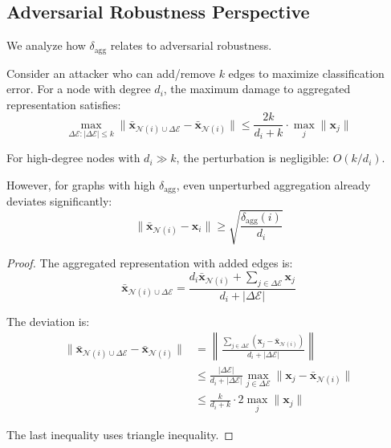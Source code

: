 \subsection{Adversarial Robustness Perspective}

We analyze how $\delta_{\text{agg}}$ relates to adversarial robustness.

\begin{theorem}
\label{thm:adversarial}
Consider an attacker who can add/remove $k$ edges to maximize classification error. For a node with degree $d_i$, the maximum damage to aggregated representation satisfies:
\begin{equation}
\max_{\Delta \mathcal{E}: |\Delta \mathcal{E}| \leq k} \|\bar{\mathbf{x}}_{\mathcal{N}(i) \cup \Delta \mathcal{E}} - \bar{\mathbf{x}}_{\mathcal{N}(i)}\| \leq \frac{2k}{d_i + k} \cdot \max_j \|\mathbf{x}_j\|
\end{equation}

For high-degree nodes with $d_i \gg k$, the perturbation is negligible: $O(k/d_i)$.

However, for graphs with high $\delta_{\text{agg}}$, even unperturbed aggregation already deviates significantly:
\begin{equation}
\|\bar{\mathbf{x}}_{\mathcal{N}(i)} - \mathbf{x}_i\| \geq \sqrt{\frac{\delta_{\text{agg}}(i)}{d_i}}
\end{equation}
\end{theorem}

\begin{proof}
The aggregated representation with added edges is:
\begin{equation}
\bar{\mathbf{x}}_{\mathcal{N}(i) \cup \Delta \mathcal{E}} = \frac{d_i \bar{\mathbf{x}}_{\mathcal{N}(i)} + \sum_{j \in \Delta \mathcal{E}} \mathbf{x}_j}{d_i + |\Delta \mathcal{E}|}
\end{equation}

The deviation is:
\begin{align}
\|\bar{\mathbf{x}}_{\mathcal{N}(i) \cup \Delta \mathcal{E}} - \bar{\mathbf{x}}_{\mathcal{N}(i)}\| &= \left\|\frac{\sum_{j \in \Delta \mathcal{E}} (\mathbf{x}_j - \bar{\mathbf{x}}_{\mathcal{N}(i)})}{d_i + |\Delta \mathcal{E}|}\right\| \\
&\leq \frac{|\Delta \mathcal{E}|}{d_i + |\Delta \mathcal{E}|} \max_{j \in \Delta \mathcal{E}}\|\mathbf{x}_j - \bar{\mathbf{x}}_{\mathcal{N}(i)}\| \\
&\leq \frac{k}{d_i + k} \cdot 2\max_j\|\mathbf{x}_j\|
\end{align}

The last inequality uses triangle inequality.
\end{proof}

